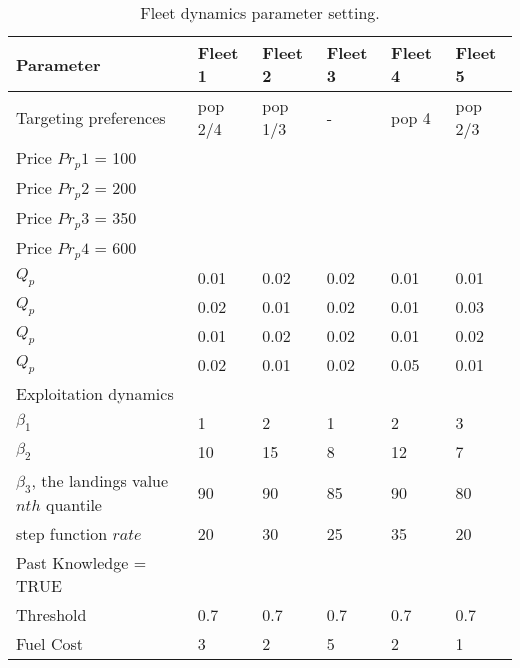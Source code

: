 \begin{table}[!ht]
\caption{Fleet dynamics parameter setting.}
\begin{tabular}{ p{4cm } p{1.2cm} p{1.2cm} p{1.2cm} p{1.2cm} p{1.2cm}}
	\hline
	Parameter & Fleet 1 & Fleet 2 & Fleet 3 & Fleet 4 & Fleet 5 \\
	\hline
	Targeting preferences & pop 2/4 & pop 1/3 & - & pop 4 & pop
	2/3 \\
	\hline
	Price $Pr_{p}1$ = 100 & & & & & \\
	Price $Pr_{p}2$ = 200 & & & & & \\
	Price $Pr_{p}3$ = 350 & & & & & \\
	Price $Pr_{p}4$ = 600 & & & & & \\
	$Q_{p}$ & 0.01 & 0.02 & 0.02 & 0.01 & 0.01 \\
	$Q_{p}$ & 0.02 & 0.01 & 0.02 & 0.01 & 0.03\\
	$Q_{p}$ & 0.01 & 0.02 & 0.02 & 0.01 & 0.02 \\
	$Q_{p}$ & 0.02 & 0.01 & 0.02 & 0.05 & 0.01 \\
	\hline
	Exploitation dynamics &&&& \\
	\hline
	$\beta_1$ & 1 & 2 & 1 & 2 & 3 \\
	$\beta_2$ & 10 & 15 & 8 & 12 & 7 \\
	$\beta_3$, the landings value $nth$ quantile &
	90 & 90 & 85 & 90 & 80 \\
	step function $rate$ & 20 & 30 & 25 & 35 & 20 \\
	Past Knowledge = TRUE & & & & & \\
	Threshold & 0.7 & 0.7 & 0.7 & 0.7 & 0.7 \\
	Fuel Cost & 3 & 2 & 5 & 2 & 1 \\
	\hline
\end{tabular}
\label{tab:2}
\end{table}

